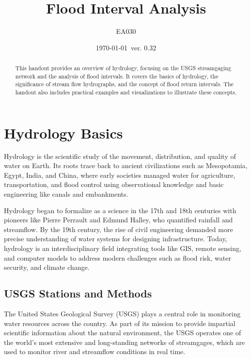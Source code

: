 \documentclass{tufte-handout}\usepackage[]{graphicx}\usepackage[]{xcolor}
\title{Flood Interval Analysis}
\author{EA030}
\date{\today~ver. 0.32}
\begin{document}
\maketitle%
\begin{abstract}
\noindent 
This handout provides an overview of hydrology, focusing on the USGS streamgaging network and the analysis of flood intervals. It covers the basics of hydrology, the significance of stream flow hydrographs, and the concept of flood return intervals. The handout also includes practical examples and visualizations to illustrate these concepts.
\end{abstract}



\section{Hydrology Basics}

Hydrology is the scientific study of the movement, distribution, and quality of water on Earth. Its roots trace back to ancient civilizations such as Mesopotamia, Egypt, India, and China, where early societies managed water for agriculture, transportation, and flood control using observational knowledge and basic engineering like canals and embankments.

Hydrology began to formalize as a science in the 17th and 18th centuries with pioneers like Pierre Perrault and Edmund Halley, who quantified rainfall and streamflow. By the 19th century, the rise of civil engineering demanded more precise understanding of water systems for designing infrastructure. Today, hydrology is an interdisciplinary field integrating tools like GIS, remote sensing, and computer models to address modern challenges such as flood risk, water security, and climate change.

\subsection{USGS Stations and Methods}

The United States Geological Survey (USGS) plays a central role in monitoring water resources across the country. As part of its mission to provide impartial scientific information about the natural environment, the USGS operates one of the world’s most extensive and long-standing networks of streamgages, which are used to monitor river and streamflow conditions in real time.
\end{document}
